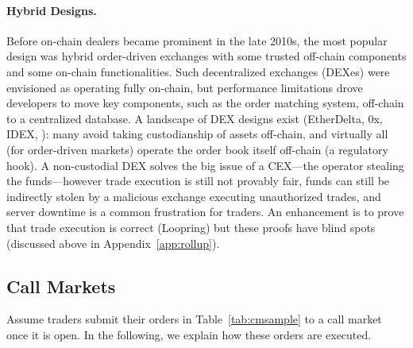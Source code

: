 \paragraph{Hybrid Designs.} Before on-chain dealers became prominent in the late 2010s, the most popular design was hybrid order-driven exchanges with some trusted off-chain components and some on-chain functionalities. Such decentralized exchanges (DEXes) were envisioned as operating fully on-chain, but performance limitations drove developers to move key components, such as the order matching system, off-chain to a centralized database. A landscape of DEX designs exist (\eg EtherDelta, 0x, IDEX, \etc): many avoid taking custodianship of assets off-chain, and virtually all (for order-driven markets) operate the order book itself off-chain (a regulatory hook). A non-custodial DEX solves the big issue of a CEX---the operator stealing the funds---however trade execution is still not provably fair, funds can still be indirectly stolen by a malicious exchange executing unauthorized trades, and server downtime is a common frustration for traders. An enhancement is to prove that trade execution is correct (\eg Loopring) but these proofs have blind spots (discussed above in Appendix~\ref{app:rollup}).

\subsection{Call Markets}
Assume traders submit their orders in Table~\ref{tab:cmsample} to a call market once it is open. In the following, we explain how these orders are executed.


